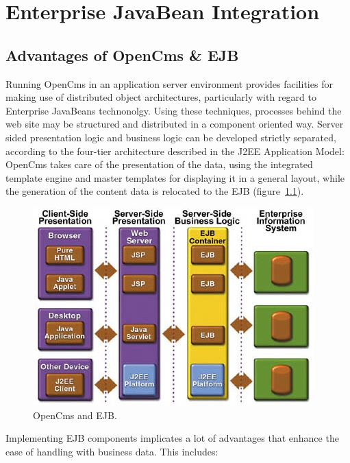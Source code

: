 \chapter {Enterprise JavaBean Integration}
\section {Advantages of OpenCms \& EJB}
Running OpenCms in an application server environment provides facilities
for making use of distributed object architectures, particularly with
regard to Enterprise JavaBeans  technonolgy. Using these techniques,
processes behind the web site may be structured and distributed in a
component oriented way. Server sided presentation logic and business
logic can be developed strictly separated, according to the four-tier
architecture described in the J2EE Application Model: OpenCms takes care
of the presentation of the data, using the integrated template engine
and master templates for displaying it in a general layout, while the
generation of the content data is relocated to the EJB (figure~\ref{EJB}).

\begin{figure}[!hbt]
\begin{center}
\includegraphics[clip,width=\sgw]{pics/ejb/ejb}
\end{center}
\caption[OpenCms and EJB]{OpenCms and EJB.}
\label{EJB}
\end{figure}

Implementing EJB components implicates a lot of advantages that enhance
the ease of handling with business data. This includes:

